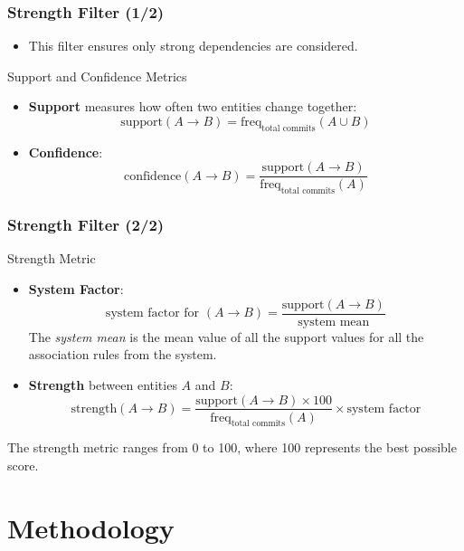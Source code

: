 \documentclass{beamer}
\begin{document}
\begin{frame}
\frametitle{Strength Filter (1/2)}
\begin{itemize}
    \item This filter ensures only strong dependencies are considered.
\end{itemize}
\begin{block}{Support and Confidence Metrics}
\begin{itemize}
    \item \textbf{Support} measures how often two entities change together:
    \[
    \text{support}(A \rightarrow B) = \text{freq}_{\text{total commits}}(A \cup B)
    \]
    \item \textbf{Confidence}:
    \[
    \text{confidence}(A \rightarrow B) = \frac{\text{support}(A \rightarrow B)}{\text{freq}_{\text{total commits}}(A)}
    \]
\end{itemize}
\end{block}
\end{frame}

\begin{frame}
\frametitle{Strength Filter (2/2)}

\begin{block}{Strength Metric}
\begin{itemize}
    \item \textbf{System Factor}:
    \[
    \text{system factor for }(A \rightarrow B) = \frac{\text{support}(A \rightarrow B)}{\text{system mean}}
    \]
The \textit{system mean} is the mean value of all the support values for all the association rules from the system. 
    \item \textbf{Strength} between entities \( A \) and \( B \):
    \[
    \text{strength}(A \rightarrow B) = \frac{\text{support}(A \rightarrow B) \times 100}{\text{freq}_{\text{total commits}}(A)} \times \text{system factor}
    \]
\end{itemize}
 The strength metric ranges from 0 to 100, where 100 represents the best possible score.

\end{block}
\end{frame}



\section{Methodology}
\end{document}
